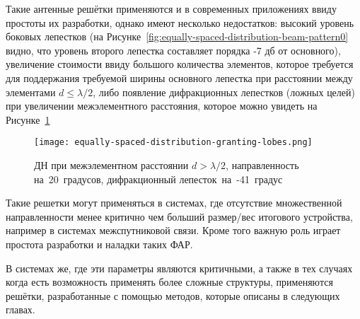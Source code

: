 Такие антенные решётки применяются и в современных приложениях ввиду простоты их разработки, однако имеют
несколько недостатков: высокий уровень боковых лепестков
(на Рисунке~\ref{fig:equally-spaced-distribution-beam-pattern0}
видно, что уровень второго лепестка составляет порядка -7 дб от основного), увеличение стоимости ввиду
большого количества  элементов, которое требуется для поддержания требуемой ширины основного лепестка при
расстоянии между элементами $d \leq \lambda/2$, либо появление 
дифракционных лепестков (ложных целей) при увеличении межэлементного расстояния,
которое можно увидеть на Рисунке~\ref{fig:equally-spaced-distribution-granting-lobes}

\begin{figure}[ht]
	\centering
	\texttt{[image: equally-spaced-distribution-granting-lobes.png]}
	\caption{ДН при межэлементном расстоянии $d > \lambda/2$, 
	направленность на~20~градусов,
	дифракционный лепесток~на~-41~градус}%
	\label{fig:equally-spaced-distribution-granting-lobes}
\end{figure}

Такие решетки могут применяться в системах, где отсутствие множественной направленности менее критично чем
больший размер/вес итогового устройства, например в системах межспутниковой связи. Кроме того важную роль
играет простота разработки и наладки таких ФАР. 

В системах же, где эти параметры являются критичными, а также в тех случаях когда есть возможность применять
более сложные структуры, применяются решётки, разработанные с помощью методов, которые описаны в следующих
главах.
